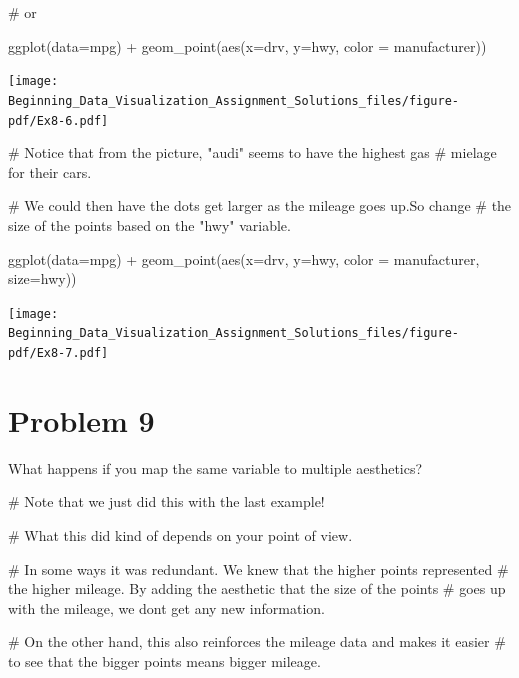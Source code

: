 \documentclass[
  letterpaper,
  DIV=11,
  numbers=noendperiod]{scrreprt}
\newenvironment{Shaded}{\begin{snugshade}}{\end{snugshade}}
\newcommand{\AttributeTok}[1]{\textcolor[rgb]{0.40,0.45,0.13}{#1}}
\newcommand{\CommentTok}[1]{\textcolor[rgb]{0.37,0.37,0.37}{#1}}
\newcommand{\FunctionTok}[1]{\textcolor[rgb]{0.28,0.35,0.67}{#1}}
\newcommand{\NormalTok}[1]{\textcolor[rgb]{0.00,0.23,0.31}{#1}}
\newcommand{\SpecialCharTok}[1]{\textcolor[rgb]{0.37,0.37,0.37}{#1}}
\begin{document}
\begin{Shaded}
\begin{Highlighting}[]
\CommentTok{\# or}

\FunctionTok{ggplot}\NormalTok{(}\AttributeTok{data=}\NormalTok{mpg) }\SpecialCharTok{+}
  \FunctionTok{geom\_point}\NormalTok{(}\FunctionTok{aes}\NormalTok{(}\AttributeTok{x=}\NormalTok{drv, }\AttributeTok{y=}\NormalTok{hwy, }\AttributeTok{color =}\NormalTok{ manufacturer))}
\end{Highlighting}
\end{Shaded}

\texttt{[image: Beginning\_Data\_Visualization\_Assignment\_Solutions\_files/figure-pdf/Ex8-6.pdf]}

\begin{Shaded}
\begin{Highlighting}[]
\CommentTok{\# Notice that from the picture, "audi" seems to have the highest gas}
\CommentTok{\# mielage for their cars.}

\CommentTok{\# We could then have the dots get larger as the mileage goes up.So change }
\CommentTok{\# the size of the points based on the "hwy" variable.}

\FunctionTok{ggplot}\NormalTok{(}\AttributeTok{data=}\NormalTok{mpg) }\SpecialCharTok{+}
  \FunctionTok{geom\_point}\NormalTok{(}\FunctionTok{aes}\NormalTok{(}\AttributeTok{x=}\NormalTok{drv, }\AttributeTok{y=}\NormalTok{hwy, }\AttributeTok{color =}\NormalTok{ manufacturer, }\AttributeTok{size=}\NormalTok{hwy))}
\end{Highlighting}
\end{Shaded}

\texttt{[image: Beginning\_Data\_Visualization\_Assignment\_Solutions\_files/figure-pdf/Ex8-7.pdf]}

\section*{Problem 9}\label{problem-9-3}


What happens if you map the same variable to multiple aesthetics?

\begin{Shaded}
\begin{Highlighting}[]
\CommentTok{\# Note that we just did this with the last example! }

\CommentTok{\# What this did kind of depends on your point of view. }

\CommentTok{\# In some ways it was redundant. We knew that the higher points represented}
\CommentTok{\# the higher mileage. By adding the aesthetic that the size of the points}
\CommentTok{\# goes up with the mileage, we don\textquotesingle{}t get any new information.}

\CommentTok{\# On the other hand, this also reinforces the mileage data and makes it easier }
\CommentTok{\# to see that the bigger points means bigger mileage. }
\end{Highlighting}
\end{Shaded}
\end{document}
